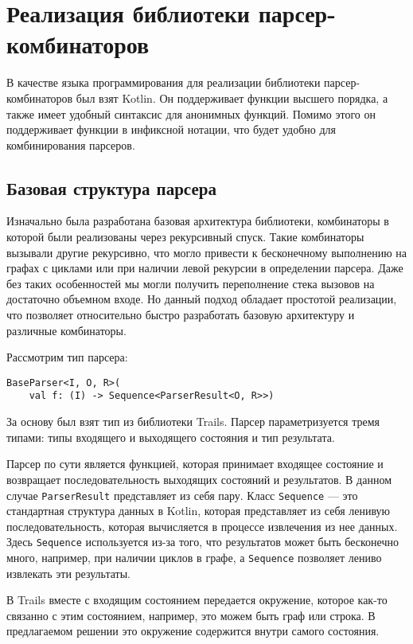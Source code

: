 \chapter{Реализация библиотеки парсер-комбинаторов}
\label{ch:ch3}

В качестве языка программирования для реализации библиотеки парсер-комбинаторов был взят Kotlin.
Он поддерживает функции высшего порядка, а также имеет удобный синтаксис для анонимных функций.
Помимо этого он поддерживает функции в инфиксной нотации, что будет удобно для комбинирования парсеров.


\section{Базовая структура парсера}

Изначально была разработана базовая архитектура библиотеки, комбинаторы в которой были реализованы через рекурсивный спуск.
Такие комбинаторы вызывали другие рекурсивно, что могло привести к бесконечному выполнению на графах с циклами или при наличии левой рекурсии в определении парсера.
Даже без таких особенностей мы могли получить переполнение стека вызовов на достаточно объемном входе.
Но данный подход обладает простотой реализации, что позволяет относительно быстро разработать базовую архитектуру и различные комбинаторы.

Рассмотрим тип парсера:
\begin{lstlisting}
BaseParser<I, O, R>(
    val f: (I) -> Sequence<ParserResult<O, R>>)
\end{lstlisting}
За основу был взят тип из библиотеки Trails. Парсер параметризуется тремя типами: типы входящего и выходящего состояния и тип результата.

Парсер по сути является функцией, которая принимает входящее состояние и возвращает последовательность выходящих состояний и результатов. В данном случае \verb|ParserResult| представляет из себя пару. Класс \verb|Sequence| --- это стандартная структура данных в Kotlin, которая представляет из себя ленивую последовательность, которая вычисляется в процессе извлечения из нее данных. Здесь \verb|Sequence| используется из-за того, что результатов может быть бесконечно много, например, при наличии циклов в графе, а \verb|Sequence| позволяет лениво извлекать эти результаты.

В Trails вместе с входящим состоянием передается окружение, которое как-то связанно с этим состоянием, например, это можем быть граф или строка. В предлагаемом решении это окружение содержится внутри самого состояния.

